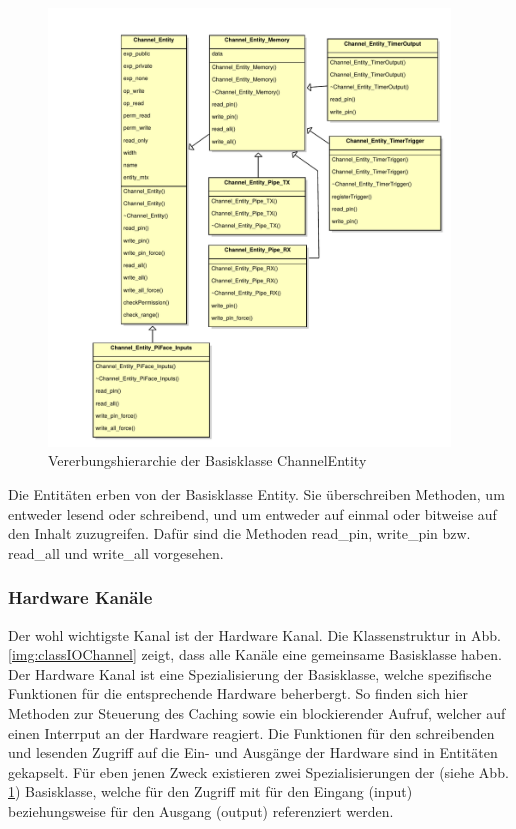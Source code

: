 \begin{figure}[H]
	\begin{center}
		\includegraphics[width=0.95\textwidth ,clip]{./code/ChannelEntity.pdf}
		\caption{Vererbungshierarchie der Basisklasse ChannelEntity}
		\label{img:classChannelEntity}
	\end{center} 
\end{figure}	

Die Entitäten erben von der Basisklasse Entity. Sie überschreiben Methoden, um entweder lesend oder schreibend, und um entweder auf einmal oder bitweise auf den Inhalt zuzugreifen. Dafür sind die Methoden read\_pin, write\_pin bzw. read\_all und write\_all vorgesehen. 



\subsubsection{Hardware Kanäle}\label{kap:ums:hwchannels}
Der wohl wichtigste Kanal ist der Hardware Kanal. Die Klassenstruktur in Abb. \ref{img:classIOChannel} zeigt, dass alle Kanäle eine gemeinsame Basisklasse haben. Der Hardware Kanal ist eine Spezialisierung der Basisklasse, welche spezifische Funktionen für die entsprechende Hardware beherbergt. So finden sich hier Methoden zur Steuerung des Caching sowie ein blockierender Aufruf, welcher auf einen Interrput an der Hardware reagiert. Die Funktionen für den schreibenden und lesenden Zugriff auf die Ein- und Ausgänge der Hardware sind in Entitäten gekapselt. Für eben jenen Zweck existieren zwei Spezialisierungen der  (siehe Abb. \ref{img:classChannelEntity}) Basisklasse, welche für den Zugriff mit  für den Eingang (input) beziehungsweise  für den Ausgang (output) referenziert werden.   


